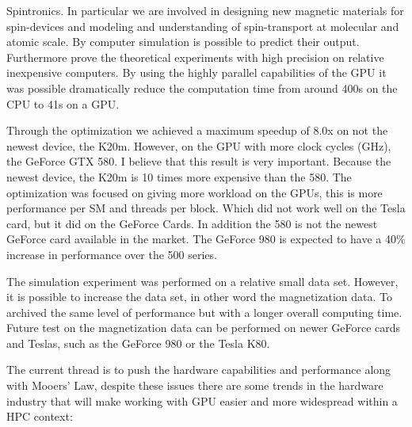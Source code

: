 Spintronics. In particular we are involved in designing new magnetic materials for spin-devices and modeling and understanding of spin-transport at molecular and atomic scale. By computer simulation is possible to predict their output. Furthermore prove the theoretical experiments with high precision on relative inexpensive computers. By using the highly parallel capabilities of the GPU it was possible dramatically reduce the computation time from around 400s on the CPU to 41s on a GPU.

Through the optimization we achieved a maximum speedup of 8.0x on not the newest device, the K20m. However, on the GPU with more clock cycles (GHz), the GeForce GTX 580. I believe that this result is very important. Because the newest device, the K20m is 10 times more expensive than the 580. The optimization was focused on giving more workload on the GPUs, this is more performance per SM and threads per block. Which did not work well on the Tesla card, but it did on the GeForce Cards. In addition the 580 is not the newest GeForce card available in the market. The GeForce 980 is expected to have a 40$\%$ increase in performance over the 500 series. 

The simulation experiment was performed on a relative small data set. However, it is possible to increase the data set, in other word the magnetization data. To archived the same level of performance but with a longer overall computing time.  Future test  on the magnetization data can be performed on newer GeForce cards and Teslas, such as the GeForce 980 or the Tesla K80.

The current thread is to push the hardware capabilities and performance along with Mooers' Law, despite these issues there are some trends in the hardware industry that will make working with GPU easier and more widespread within a HPC context:

